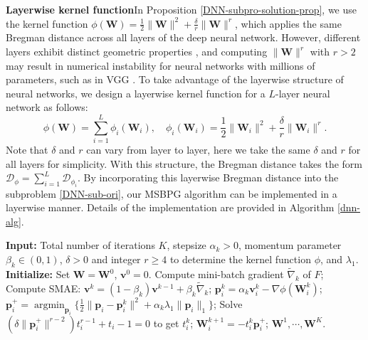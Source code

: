 \documentclass[twoside,11pt]{article}
\newcommand{\be}{\begin{equation}}
\newcommand{\ee}{\end{equation}}
\newcommand{\cD}{\mathcal D}
\DeclareMathOperator*{\argmin}{argmin}
\def\vp{{\bm{p}}}
\def\vv{{\bm{v}}}
\def\mW{{\bm{W}}}
\begin{document}
\noindent\textbf{Layerwise kernel function}\quad In Proposition \ref{DNN-subpro-solution-prop}, we use the kernel function $\phi({\mW})=\frac{1}{2}\|{\mW}\|^2+\frac{\delta}{r}\|{\mW}\|^{r}$, which applies the same Bregman distance across all layers of the deep neural network. However, different layers exhibit distinct geometric properties \citep{you2019large}, and computing $\|\mW\|^r$ with $r>2$ may result in numerical instability for neural networks with millions of parameters, such as in VGG \citep{simonyan2014very}. To take advantage of the layerwise structure of neural networks, we design a layerwise kernel function for a $L$-layer neural network as follows:
\be
\phi({\mW})=\sum_{i=1}^L\phi_i({\mW}_i),\quad \phi_i({\mW}_i)=\frac{1}{2}\|{\mW}_i\|^2+\frac{\delta}{r}\|{\mW}_i\|^{r}.
\label{kernel-nn}
\ee
Note that $\delta$ and $r$ can vary from layer to layer, here we take the same $\delta$ and $r$ for all layers for simplicity. With this structure, the Bregman distance takes the form $\cD_\phi=\sum_{i=1}^L\cD_{\phi_i}$. By incorporating this layerwise Bregman distance into the subproblem \eqref{DNN-sub-ori}, our MSBPG algorithm can be implemented in a layerwise manner. Details of the implementation are provided in Algorithm \ref{dnn-alg}.
\begin{algorithm}[ht] 
    \caption{Momentum based Stochastic Bregman Proximal Gradient (MSBPG) for training neural networks}
    \begin{algorithmic}[1]
        \State \textbf{Input: }Total number of iterations $K$, stepsize $\alpha_k>0$, momentum parameter $\beta_k\in(0,1)$, $\delta>0$ and integer $r\geq4$ to determine the kernel function $\phi$, and $\lambda_1.$
        \State \textbf{Initialize: }Set $\mW=\mW^0$, $\vv^0=0$.
        \State Compute mini-batch gradient $\widetilde\nabla_k$ of $F$;
        \State Compute SMAE: $\vv^k=(1-\beta_k)\vv^{k-1}+\beta_k\widetilde\nabla_k$;
        \State $\vp_i^k = \alpha_k \vv_i^k - \nabla\phi(\mW^{k}_i)$;
        \State $\vp_i^+ = \argmin_{\vp_i}\{\frac{1}{2}\|\vp_i-\vp_i^k\|^2+\alpha_k\lambda_1\|\vp_i\|_1\}$;
        \State Solve $(\delta \|\vp^+_i\|^{r-2})t_i^{r-1} + t_i -1 =0$ to get $t_i^k$;
        \State $\mW_i^{k+1} = - t_i^k \vp_i^+$;
        \EndFor
        \EndFor
        $\mW^1, \cdots, \mW^K$.
    \end{algorithmic}\label{dnn-alg}
\end{algorithm}

\end{document}
